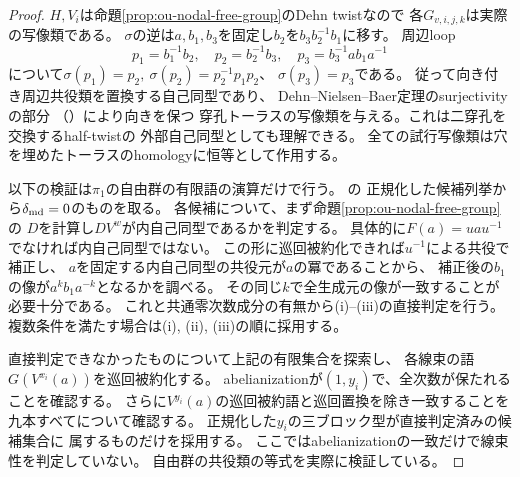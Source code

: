 \begin{proof}
$H,V_i$は命題\ref{prop:ou-nodal-free-group}のDehn twistなので
各$G_{v,i,j,k}$は実際の写像類である。
$\sigma$の逆は$a,b_1,b_3$を固定し$b_2$を$b_3b_2^{-1}b_1$に移す。
周辺loop
\[
 p_1=b_1^{-1}b_2,\quad p_2=b_2^{-1}b_3,\quad
 p_3=b_3^{-1}ab_1a^{-1}
\]
について$\sigma(p_1)=p_2,\ \sigma(p_2)=p_2^{-1}p_1p_2$、
$\sigma(p_3)=p_3$である。
従って向き付き周辺共役類を置換する自己同型であり、
Dehn--Nielsen--Baer定理のsurjectivityの部分
（\cite[Chapter~8]{FarbMargalit2012}）により向きを保つ
穿孔トーラスの写像類を与える。これは二穿孔を交換するhalf-twistの
外部自己同型としても理解できる。
全ての試行写像類は穴を埋めたトーラスのhomologyに恒等として作用する。

以下の検証は$\pi_1$の自由群の有限語の演算だけで行う。
の
正規化した候補列挙から$\delta_{\rm md}=0$のものを取る。
各候補について、まず命題\ref{prop:ou-nodal-free-group}の
$D$を計算し$DV^w$が内自己同型であるかを判定する。
具体的に$F(a)=uau^{-1}$でなければ内自己同型ではない。
この形に巡回被約化できれば$u^{-1}$による共役で補正し、
$a$を固定する内自己同型の共役元が$a$の冪であることから、
補正後の$b_1$の像が$a^k b_1a^{-k}$となるかを調べる。
その同じ$k$で全生成元の像が一致することが必要十分である。
これと共通零次数成分の有無から(i)--(iii)の直接判定を行う。
複数条件を満たす場合は(i), (ii), (iii)の順に採用する。

直接判定できなかったものについて上記の有限集合を探索し、
各線束の語$G(V^{x_i}(a))$を巡回被約化する。
abelianizationが$(1,y_i)$で、全次数が保たれることを確認する。
さらに$V^{y_i}(a)$の巡回被約語と巡回置換を除き一致することを
九本すべてについて確認する。
正規化した$y_i$の三ブロック型が直接判定済みの候補集合に
属するものだけを採用する。
ここではabelianizationの一致だけで線束性を判定していない。
自由群の共役類の等式を実際に検証している。


\end{proof}
